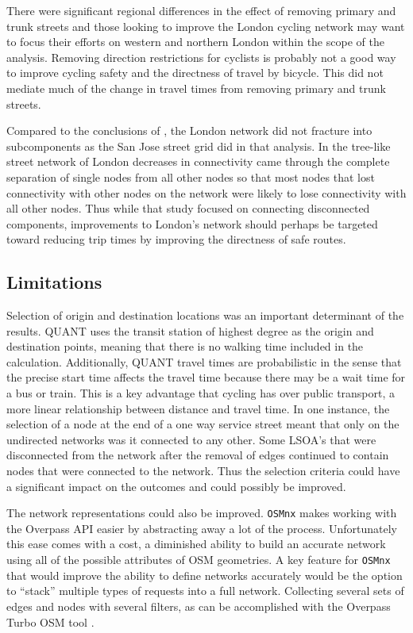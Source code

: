 There were significant regional differences in the effect of removing primary and trunk streets and those looking to improve the London cycling network may want to focus their efforts on western and northern London within the scope of the analysis. Removing direction restrictions for cyclists is probably not a good way to improve cycling safety and the directness of travel by bicycle. This did not mediate much of the change in travel times from removing primary and trunk streets. 

Compared to the conclusions of \textcite{furth2016network}, the London network did not fracture into subcomponents as the San Jose street grid did in that analysis. In the tree-like street network of London decreases in connectivity came through the complete separation of single nodes from all other nodes so that most nodes that lost connectivity with other nodes on the network were likely to lose connectivity with all other nodes. Thus while that study focused on connecting disconnected components, improvements to London's network should perhaps be targeted toward reducing trip times by improving the directness of safe routes. 

\subsection{Limitations}

Selection of origin and destination locations was an important determinant of the results. QUANT uses the transit station of highest degree as the origin and destination points, meaning that there is no walking time included in the calculation. Additionally, QUANT travel times are probabilistic in the sense that the precise start time affects the travel time because there may be a wait time for a bus or train. This is a key advantage that cycling has over public transport, a more linear relationship between distance and travel time. In one instance, the selection of a node at the end of a one way service street meant that only on the undirected networks was it connected to any other. Some LSOA's that were disconnected from the network after the removal of edges continued to contain nodes that were connected to the network. Thus the selection criteria could have a significant impact on the outcomes and could possibly be improved. 

The network representations could also be improved. \texttt{OSMnx} makes working with the Overpass API easier by abstracting away a lot of the process. Unfortunately this ease comes with a cost, a diminished ability to build an accurate network using all of the possible attributes of OSM geometries. A key feature for \texttt{OSMnx} that would improve the ability to define networks accurately would be the option to ``stack'' multiple types of requests into a full network. Collecting several sets of edges and nodes with several filters, as can be accomplished with the Overpass Turbo OSM tool \parencite{overpass_turbo}. 

